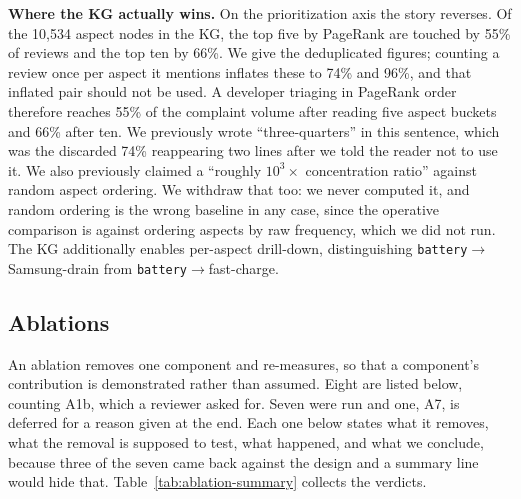 \documentclass[preprint,12pt]{elsarticle}
\begin{document}
  \textbf{Where the KG actually wins.} On the prioritization axis the story reverses. Of the
  10{,}534 aspect nodes in the KG, the top five by PageRank are touched by 55\% of reviews and
  the top ten by 66\%. We give the deduplicated figures; counting a review once per aspect it
  mentions inflates these to 74\% and 96\%, and that inflated pair should not be used. A developer
  triaging in PageRank order therefore reaches 55\% of the complaint volume after reading five
  aspect buckets and 66\% after ten. We previously wrote ``three-quarters'' in this sentence,
  which was the discarded 74\% reappearing two lines after we told the reader not to use it. We
  also previously claimed a ``roughly $10^3\times$ concentration ratio'' against random aspect
  ordering. We withdraw that too: we never computed it, and random ordering is the wrong baseline
  in any case, since the operative comparison is against ordering aspects by raw frequency, which
  we did not run. The KG additionally enables per-aspect drill-down,
   distinguishing \texttt{battery}$\to$Samsung-drain from \texttt{battery}$\to$fast-charge.

\subsection{Ablations}\label{ablations}

  An ablation removes one component and re-measures, so that a component's contribution is
  demonstrated rather than assumed. Eight are listed below, counting A1b, which a reviewer asked for. Seven were run and one, A7,
  is deferred for a reason given at the end. Each one below states what it removes, what
  the removal is supposed to test, what happened, and what we conclude, because three of the
  seven came back against the design and a summary line would hide that.
  Table~\ref{tab:ablation-summary} collects the verdicts.
\end{document}
